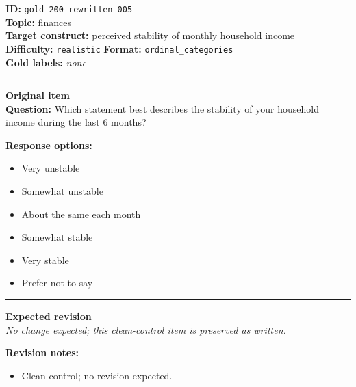 \documentclass[10pt,a4paper]{article}
\newcommand{\sectionline}{\vspace{0.15em}\hrule\vspace{0.35em}}
\begin{document}
\begin{tcolorbox}[colframe=CleanGreen,colback=white,colbacktitle=CleanGreen!9,coltitle=black,title={Item 005\hfill Clean control}]
\textbf{ID:} \texttt{gold-200-rewritten-005}\\
\textbf{Topic:} finances\\
\textbf{Target construct:} perceived stability of monthly household income\\
\textbf{Difficulty:} \texttt{realistic} \quad \textbf{Format:} \texttt{ordinal\_categories}\\
\textbf{Gold labels:} \textit{none}\\
\sectionline
\textbf{Original item}\\
\textbf{Question:} Which statement best describes the stability of your household income during the last 6 months?
\par\textbf{Response options:}
\begin{itemize}
\item Very unstable
\item Somewhat unstable
\item About the same each month
\item Somewhat stable
\item Very stable
\item Prefer not to say
\end{itemize}
\sectionline
\textbf{Expected revision}\\
\textit{No change expected; this clean-control item is preserved as written.}
\par\textbf{Revision notes:}
\begin{itemize}
\item Clean control; no revision expected.
\end{itemize}
\end{tcolorbox}
\end{document}
